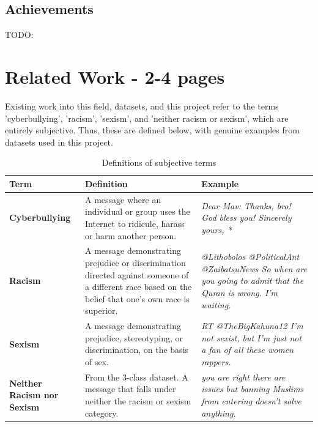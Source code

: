\documentclass[12pt,a4paper]{article}
\begin{document}
\subsection{Achievements}
TODO: \newpage




\section{Related Work - 2-4 pages}

Existing work into this field, datasets, and this project refer to the terms 'cyberbullying', 'racism', 'sexism', and 'neither racism or sexism', which are entirely subjective. Thus, these are defined below, with genuine examples from datasets used in this project.

\begin{table}[htb]
	\centering
	\caption{Definitions of subjective terms}
	\label{terms}
	\hspace*{-1.5cm}
	\begin{tabular}{p{2.8cm} p{8.0cm} p{7cm}} \hline\hline
		\textbf{Term} & \textbf{Definition} & \textbf{Example}  \\ \hline
		\textbf{Cyberbullying} & A message where an individual or group uses the Internet to ridicule, harass or harm another person. &  \textit{Dear Mav: Thanks, bro! God bless you!  Sincerely yours, *} \\ \hline
		\textbf{Racism} & A message demonstrating prejudice or discrimination directed against someone of a different race based on the belief that one's own race is superior. & \textit{@Lithobolos @PoliticalAnt @ZaibatsuNews So when are you going to admit that the Quran is wrong.  I'm waiting.} \\ \hline
		\textbf{Sexism} & A message demonstrating prejudice, stereotyping, or discrimination, on the basis of sex. & \textit{RT @TheBigKahuna12 I'm not sexist, but I'm just not a fan of all these women rappers.} \\ \hline
		\textbf{Neither Racism nor Sexism} & From the 3-class dataset. A message that falls under neither the racism or sexism category. & \textit{you are right there are issues but banning Muslims from entering doesn’t solve anything.}\\ \hline
		
	\end{tabular}
\end{table}
\end{document}
